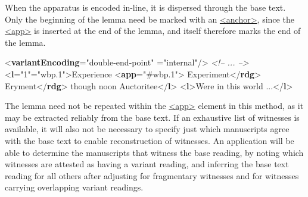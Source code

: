 When the apparatus is encoded in-line, it is dispersed through the base text. Only the beginning of the lemma need be marked with an \hyperref[TEI.anchor]{<anchor>}, since the \hyperref[TEI.app]{<app>} is inserted at the end of the lemma, and itself therefore marks the end of the lemma. \par\bgroup{}\exampleFont \begin{shaded}\noindent\mbox{}{<\textbf{variantEncoding}\hspace*{1em}{method}="{double-end-point}"\mbox{}\newline 
\hspace*{1em}{location}="{internal}"/>}\mbox{}\newline 
\textit{<!-- ... -->}\mbox{}\newline 
{<\textbf{l}\hspace*{1em}{n}="{1}"\hspace*{1em}{xml:id}="{wbp.1}">}Experience\mbox{}\newline 
{<\textbf{app}\hspace*{1em}{from}="{\#wbp.1}">}\mbox{}\newline 
\hspace*{1em}Experiment{</\textbf{rdg}>}\mbox{}\newline 
\hspace*{1em}Eryment{</\textbf{rdg}>}\mbox{}\newline 
{}\mbox{}\newline 
 though noon Auctoritee{</\textbf{l}>}\mbox{}\newline 
{<\textbf{l}>}Were in this world ...{</\textbf{l}>}\end{shaded}\egroup\par \par
The lemma need not be repeated within the \hyperref[TEI.app]{<app>} element in this method, as it may be extracted reliably from the base text. If an exhaustive list of witnesses is available, it will also not be necessary to specify just which manuscripts agree with the base text to enable reconstruction of witnesses. An application will be able to determine the manuscripts that witness the base reading, by noting which witnesses are attested as having a variant reading, and inferring the base text reading for all others after adjusting for fragmentary witnesses and for witnesses carrying overlapping variant readings.\par
